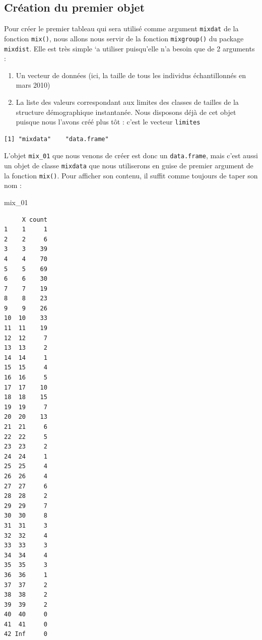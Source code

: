 \documentclass[
  a4paper,
  DIV=11,
  numbers=noendperiod,
  oneside]{scrreprt}
\newenvironment{Shaded}{}{}
\newcommand{\AttributeTok}[1]{\textcolor[rgb]{0.84,0.23,0.29}{#1}}
\newcommand{\FunctionTok}[1]{\textcolor[rgb]{0.44,0.26,0.76}{#1}}
\newcommand{\NormalTok}[1]{\textcolor[rgb]{0.14,0.16,0.18}{#1}}
\newcommand{\OtherTok}[1]{\textcolor[rgb]{0.44,0.26,0.76}{#1}}
\newcommand{\SpecialCharTok}[1]{\textcolor[rgb]{0.00,0.36,0.77}{#1}}
\providecommand{\tightlist}{%
  \setlength{\itemsep}{0pt}\setlength{\parskip}{0pt}}\usepackage{longtable,booktabs,array}
\begin{document}
\hypertarget{cruxe9ation-du-premier-objet}{%
\subsection{Création du premier
objet}\label{cruxe9ation-du-premier-objet}}

Pour créer le premier tableau qui sera utilisé comme argument
\texttt{mixdat} de la fonction \texttt{mix()}, nous allons nous servir
de la fonction \texttt{mixgroup()} du package \texttt{mixdist}. Elle est
très simple `a utiliser puisqu'elle n'a besoin que de 2 arguments :

\begin{enumerate}
\def\labelenumi{\arabic{enumi}.}
\tightlist
\item
  Un vecteur de données (ici, la taille de tous les individus
  échantillonnés en mars 2010)
\item
  La liste des valeurs correspondant aux limites des classes de tailles
  de la structure démographique instantanée. Nous disposons déjà de cet
  objet puisque nous l'avons créé plus tôt : c'est le vecteur
  \texttt{limites}
\end{enumerate}

\begin{Shaded}
\end{Shaded}

\begin{verbatim}
[1] "mixdata"    "data.frame"
\end{verbatim}

L'objet \texttt{mix\_01} que nous venons de créer est donc un
\texttt{data.frame}, mais c'est aussi un objet de classe
\texttt{mixdata} que nous utiliserons en guise de premier argument de la
fonction \texttt{mix()}. Pour afficher son contenu, il suffit comme
toujours de taper son nom :

\begin{Shaded}
\begin{Highlighting}[]
\NormalTok{mix\_01}
\end{Highlighting}
\end{Shaded}

\begin{verbatim}
     X count
1    1     1
2    2     6
3    3    39
4    4    70
5    5    69
6    6    30
7    7    19
8    8    23
9    9    26
10  10    33
11  11    19
12  12     7
13  13     2
14  14     1
15  15     4
16  16     5
17  17    10
18  18    15
19  19     7
20  20    13
21  21     6
22  22     5
23  23     2
24  24     1
25  25     4
26  26     4
27  27     6
28  28     2
29  29     7
30  30     8
31  31     3
32  32     4
33  33     3
34  34     4
35  35     3
36  36     1
37  37     2
38  38     2
39  39     2
40  40     0
41  41     0
42 Inf     0
\end{verbatim}
\end{document}
